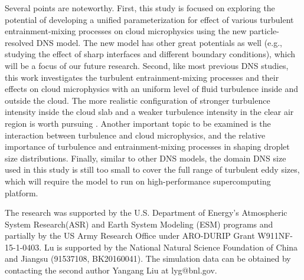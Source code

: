 \documentclass[draft,linenumbers]{agujournal}
\begin{document}
{\color{green}Several points are noteworthy. First, this study is focused on exploring the potential of developing a unified parameterization for effect of various turbulent entrainment-mixing processes on cloud microphysics using the new particle-resolved DNS model. The new model has other great potentials as well (e.g., studying the effect of sharp interfaces and different boundary conditions), which will be a focus of our future research. Second, like most previous DNS studies, this work investigates the turbulent entrainment-mixing processes and their effects on cloud microphysics with an uniform level of fluid turbulence inside and outside the cloud. The more realistic configuration of stronger turbulence intensity inside the cloud slab and a weaker turbulence intensity in the clear air region is worth pursuing \citep{gotzfried2017}.} Another important topic to be examined is the interaction between turbulence and cloud microphysics, and the relative importance of turbulence and entrainment-mixing processes in shaping droplet size distributions. Finally, similar to other DNS models, the domain DNS size used in this study is still too small to cover the full range of turbulent eddy sizes, which will require the model to run on high-performance supercomputing platform.

\acknowledgments
The research was supported by the U.S. Department of Energy's Atmospheric System Research(ASR) and Earth System Modeling (ESM) programs and partially by the US Army Research Office under ARO-DURIP Grant W911NF-15-1-0403. Lu is supported by the National Natural Science Foundation of China and Jiangsu (91537108, BK20160041). The simulation data can be obtained by contacting the second author Yangang Liu at lyg@bnl.gov.
\end{document}
